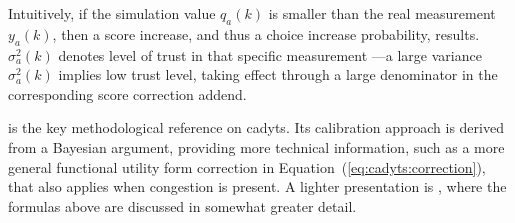 Intuitively, if the simulation value $q_a(k)$ is smaller than the real measurement 
$y_a(k)$, then a score increase, and thus a choice increase 
probability, results. 
$\sigma^2_a(k)$ denotes level of trust in that specific measurement
---a large variance $\sigma^2_a(k)$ implies low trust level, taking effect through
a large denominator in the corresponding score correction addend.

\citet[][]{floetteroed-2010e} is the key methodological reference on \gls{cadyts}.
Its calibration approach is derived from a Bayesian argument, providing
more technical information, such as a more general functional utility form 
correction in Equation~(\ref{eq:cadyts:correction}), that also applies when congestion is present. 
A  lighter presentation is 
\citet[][]{FloetteroedChenEtAl2011BehavioralCalibAndAnaNETS}, where the 
formulas above are discussed in somewhat greater detail.

